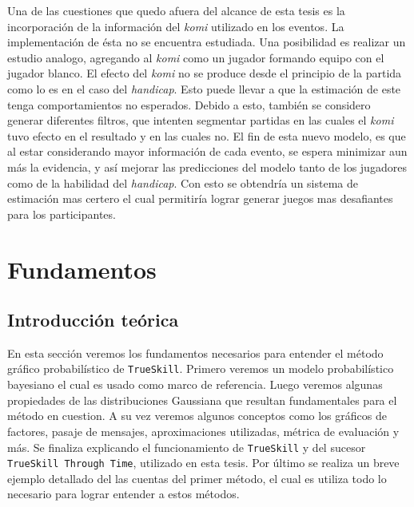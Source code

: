 \documentclass[11pt,twoside, spanish]{report} %
\begin{document}
Una de las cuestiones que quedo afuera del alcance de esta tesis es la incorporaci\'on de la informaci\'on del \textit{komi} utilizado en los eventos.
La implementaci\'on de \'esta no se encuentra estudiada.
Una posibilidad es realizar un estudio analogo, agregando al \textit{komi} como un jugador formando equipo con el jugador blanco.
El efecto del \textit{komi} no se produce desde el principio de la partida como lo es en el caso del \textit{handicap}.
Esto puede llevar a que la estimaci\'on de este tenga comportamientos no esperados.
Debido a esto, tambi\'en se considero generar diferentes filtros, que intenten segmentar partidas en las cuales el \textit{komi} tuvo efecto en el resultado y en las cuales no.
El fin de esta nuevo modelo, es que al estar considerando mayor informaci\'on de cada evento, se espera minimizar aun m\'as la evidencia, y as\'i mejorar las predicciones del modelo tanto de los jugadores como de la habilidad del \textit{handicap}.
Con esto se obtendr\'ia un sistema de estimaci\'on mas certero el cual permitir\'ia lograr generar juegos mas desafiantes para los participantes.















\chapter{Fundamentos}


\section{Introducci\'on te\'orica}

En esta secci\'on veremos los fundamentos necesarios para entender el m\'etodo gr\'afico probabil\'istico de \texttt{TrueSkill}.
Primero veremos un modelo probabil\'istico bayesiano el cual es usado como marco de referencia.
Luego veremos algunas propiedades de las distribuciones Gaussiana que resultan fundamentales para el m\'etodo en cuestion.
A su vez veremos algunos conceptos como los gr\'aficos de factores, pasaje de mensajes, aproximaciones utilizadas, m\'etrica de evaluaci\'on y m\'as.
Se finaliza explicando el funcionamiento de \texttt{TrueSkill} y del sucesor \texttt{TrueSkill Through Time}, utilizado en esta tesis.
Por \'ultimo se realiza un breve ejemplo detallado del las cuentas del primer m\'etodo, el cual es utiliza todo lo necesario para lograr entender a estos m\'etodos.
\end{document}
